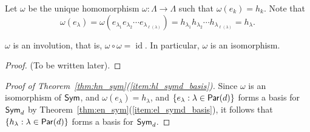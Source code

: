 Let \(\omega\) be the unique homomorphism \(\omega: \Lambda \to \Lambda\) such that \(\omega(e_k) = h_k\). Note that
\[
    \omega(e_{\lambda}) = \omega(e_{\lambda_1} e_{\lambda_2} \cdots e_{\lambda_{\ell(\lambda)}}) = h_{\lambda_1} h_{\lambda_2} \cdots h_{\lambda_{\ell(\lambda)}} = h_\lambda.
\]

\begin{theorem}
    \(\omega\) is an involution, that is, \(\omega \circ \omega = \operatorname{id}\). In particular, \(\omega\) is an isomorphism.
\end{theorem}

\begin{proof}
    (To be written later).
\end{proof}

\begin{proof}[Proof of Theorem~\ref{thm:hn_sym}(\ref{item:hl_symd_basis})]
    Since \(\omega\) is an isomorphism of \(\operatorname{\mathsf{Sym}}\), and \(\omega(e_\lambda) = h_\lambda\), and \(\{e_\lambda : \lambda \in \operatorname{\mathsf{Par}}(d)\}\) forms a basis for \(\operatorname{\mathsf{Sym}}_d\) by Theorem~\ref{thm:en_sym}(\ref{item:el_symd_basis}), it follows that \(\{h_\lambda : \lambda \in \operatorname{\mathsf{Par}}(d)\}\) forms a basis for \(\operatorname{\mathsf{Sym}}_d\).
\end{proof}
